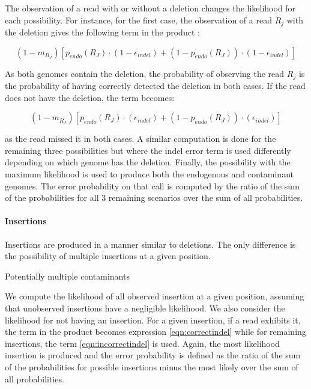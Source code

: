 \documentclass[a4paper,12pt]{article}
\begin{document}
The observation of a read with or without a deletion changes the likelihood for each possibility. For instance, for the first case, the observation of a read $R_j$ with the deletion gives the following term in the product :

\begin{equation}
 (1-m_{R_J}) [  p_{endo}(R_J) \cdot (1-\epsilon_{indel})  +  (1-p_{endo}(R_J)) \cdot (1-\epsilon_{indel}) ] 
\label{eqn:bothcorrectdel}
\end{equation}

\noindent As both genomes contain the deletion, the probability of observing the read $R_j$ is the probability of having correctly detected the deletion in both cases. If the read does not have the deletion, the term becomes:

\begin{equation}
 (1-m_{R_J}) [  p_{endo}(R_J) \cdot (\epsilon_{indel})  +  (1-p_{endo}(R_J)) \cdot (\epsilon_{indel}) ] 
\label{eqn:bothincorrectdel}
\end{equation}

\noindent as the read missed it in both cases. A similar computation is done for the remaining three possibilities but where the indel error term is used differently depending on which genome has the deletion. Finally, the possibility with the maximum likelihood is used to produce both the endogenous and contaminant genomes. The error probability on that call is computed by the ratio of the sum of the probabilities for all 3 remaining scenarios over the sum of all probabilities. 


\noindent \paragraph{Insertions}

Insertions are produced in a manner similar to deletions. The only difference is the possibility of multiple insertions at a given position. 

\noindent  Potentially multiple contaminants

We compute the likelihood of all observed insertion at a given position, assuming that unobserved insertions have a negligible likelihood. We also consider the likelihood for not having an insertion. For a given insertion, if a read exhibits it, the term in the product becomes expression \ref{eqn:correctindel} while for remaining insertions, the term \ref{eqn:incorrectindel} is used. Again, the most likelihood insertion is produced and the error probability is defined as the ratio of the sum of the probabilities for possible insertions minus the most likely over the sum of all probabilities.
\end{document}
